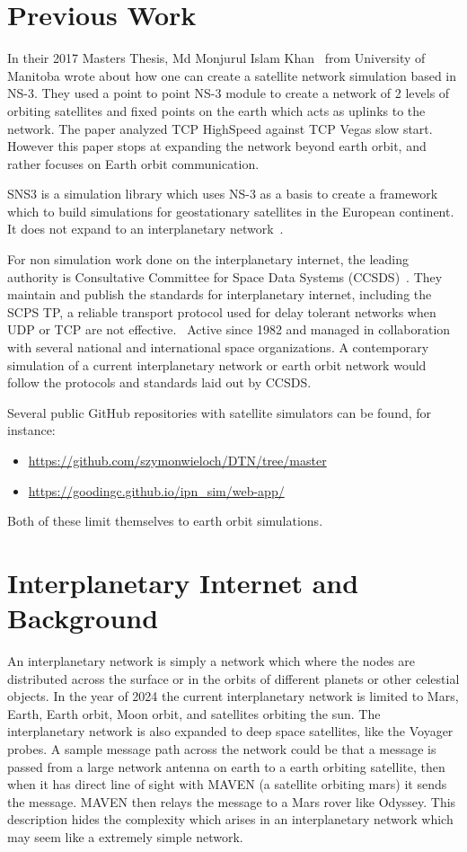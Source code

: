 \documentclass[a4paper,12pt]{article}
\begin{document}
\section{Previous Work}

In their 2017 Masters Thesis, Md Monjurul Islam Khan~\cite{Khan2017} from
University of Manitoba wrote about how one can create a satellite network
simulation based in NS-3. They used a point to point NS-3 module to create a
network of 2 levels of orbiting satellites and fixed points on the earth which
acts as uplinks to the network. The paper analyzed TCP HighSpeed against TCP
Vegas slow start. However this paper stops at expanding the network beyond earth
orbit, and rather focuses on Earth orbit communication.

SNS3 is a simulation library which uses NS-3 as a basis to create a framework
which to build simulations for geostationary satellites in the European
continent. It does not expand to an interplanetary network~\cite{Puttonen2014}.

For non simulation work done on the interplanetary internet, the leading
authority is Consultative Committee for Space Data Systems
(CCSDS)~\cite{CCSDS.org}. They maintain and publish the standards for
interplanetary internet, including the SCPS TP, a reliable transport protocol
used for delay tolerant networks when UDP or TCP are not
effective.~\cite{Keith2004} Active since 1982 and managed in collaboration with
several national and international space organizations. A contemporary
simulation of a current interplanetary network or earth orbit network would
follow the protocols and standards laid out by CCSDS.

Several public GitHub repositories with satellite simulators can be
found, for instance:
\begin{itemize}
\item\url{https://github.com/szymonwieloch/DTN/tree/master}
\item\url{https://goodingc.github.io/ipn_sim/web-app/}
\end{itemize}
Both of these limit themselves to earth orbit simulations.

\section{Interplanetary Internet and Background}

An interplanetary network is simply a network which where the nodes are
distributed across the surface or in the orbits of different planets or other
celestial objects. In the year of 2024 the current interplanetary network is
limited to Mars, Earth, Earth orbit, Moon orbit, and satellites orbiting the
sun. The interplanetary network is also expanded to deep space satellites, like
the Voyager probes. A sample message path across the network could be that a
message is passed from a large network antenna on earth to a earth orbiting
satellite, then when it has direct line of sight with MAVEN (a satellite
orbiting mars) it sends the message. MAVEN then relays the message to a Mars
rover like Odyssey. This description hides the complexity which arises in an
interplanetary network which may seem like a extremely simple network.
\end{document}
